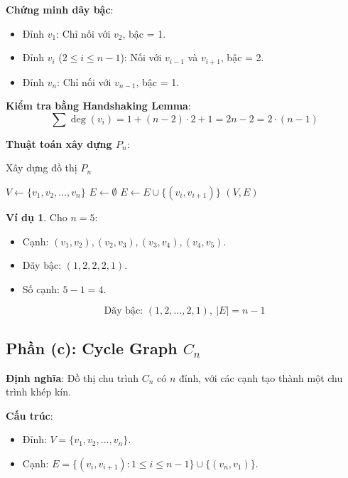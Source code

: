 \documentclass[a4paper,12pt]{article}
\theoremstyle{plain}
\theoremstyle{definition}
\newtheorem{example}{Ví dụ}
\begin{document}
\textbf{Chứng minh dãy bậc}:
\begin{itemize}
    \item Đỉnh \( v_1 \): Chỉ nối với \( v_2 \), bậc = 1.
    \item Đỉnh \( v_i \) (\( 2 \leq i \leq n-1 \)): Nối với \( v_{i-1} \) và \( v_{i+1} \), bậc = 2.
    \item Đỉnh \( v_n \): Chỉ nối với \( v_{n-1} \), bậc = 1.
\end{itemize}

\textbf{Kiểm tra bằng Handshaking Lemma}:
\[
\sum \deg(v_i) = 1 + (n-2) \cdot 2 + 1 = 2n - 2 = 2 \cdot (n-1)
\]

\textbf{Thuật toán xây dựng \( P_n \)}:
\begin{algorithm}
\caption{Xây dựng đồ thị \( P_n \)}
\begin{algorithmic}
    \State $V \gets \{v_1, v_2, \ldots, v_n\}$
    \State $E \gets \emptyset$
        \State $E \gets E \cup \{(v_i, v_{i+1})\}$
    \EndFor
    \State \Return $(V, E)$
\EndFunction
\end{algorithmic}
\end{algorithm}

\begin{example}
Cho \( n=5 \):
\begin{itemize}
    \item Cạnh: \( (v_1, v_2), (v_2, v_3), (v_3, v_4), (v_4, v_5) \).
    \item Dãy bậc: \( (1, 2, 2, 2, 1) \).
    \item Số cạnh: \( 5-1 = 4 \).
\end{itemize}
\end{example}

\[
\boxed{\text{Dãy bậc: } (1, 2, \ldots, 2, 1), \ |E| = n-1}
\]

\subsection*{Phần (c): Cycle Graph \( C_n \)}

\textbf{Định nghĩa}: Đồ thị chu trình \( C_n \) có \( n \) đỉnh, với các cạnh tạo thành một chu trình khép kín.

\textbf{Cấu trúc}:
\begin{itemize}
    \item Đỉnh: \( V = \{v_1, v_2, \ldots, v_n\} \).
    \item Cạnh: \( E = \{(v_i, v_{i+1}) : 1 \leq i \leq n-1\} \cup \{(v_n, v_1)\} \).
\end{itemize}
\end{document}

